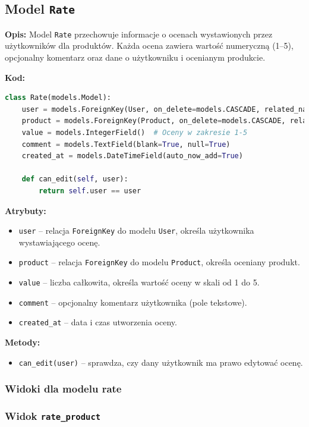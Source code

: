 \documentclass[12pt,a4paper,oneside]{article}
\theoremstyle{definition}
\numberwithin{equation}{section}
\begin{document}
\subsection{Model \texttt{Rate}}

\textbf{Opis:}  
Model \texttt{Rate} przechowuje informacje o ocenach wystawionych przez użytkowników dla produktów. Każda ocena zawiera wartość numeryczną (1–5), opcjonalny komentarz oraz dane o użytkowniku i ocenianym produkcie.

\textbf{Kod:}
\begin{lstlisting}[language=Python]
class Rate(models.Model):
    user = models.ForeignKey(User, on_delete=models.CASCADE, related_name='ratings')
    product = models.ForeignKey(Product, on_delete=models.CASCADE, related_name='ratings')
    value = models.IntegerField()  # Oceny w zakresie 1-5
    comment = models.TextField(blank=True, null=True)
    created_at = models.DateTimeField(auto_now_add=True)

    def can_edit(self, user):
        return self.user == user
\end{lstlisting}

\textbf{Atrybuty:}
\begin{itemize}
    \item \texttt{user} – relacja \texttt{ForeignKey} do modelu \texttt{User}, określa użytkownika wystawiającego ocenę.
    \item \texttt{product} – relacja \texttt{ForeignKey} do modelu \texttt{Product}, określa oceniany produkt.
    \item \texttt{value} – liczba całkowita, określa wartość oceny w skali od 1 do 5.
    \item \texttt{comment} – opcjonalny komentarz użytkownika (pole tekstowe).
    \item \texttt{created\_at} – data i czas utworzenia oceny.
\end{itemize}

\textbf{Metody:}
\begin{itemize}
    \item \texttt{can\_edit(user)} – sprawdza, czy dany użytkownik ma prawo edytować ocenę.
\end{itemize}


\subsubsection{Widoki dla modelu rate}

\subsubsection*{Widok \texttt{rate\_product}}
\end{document}
